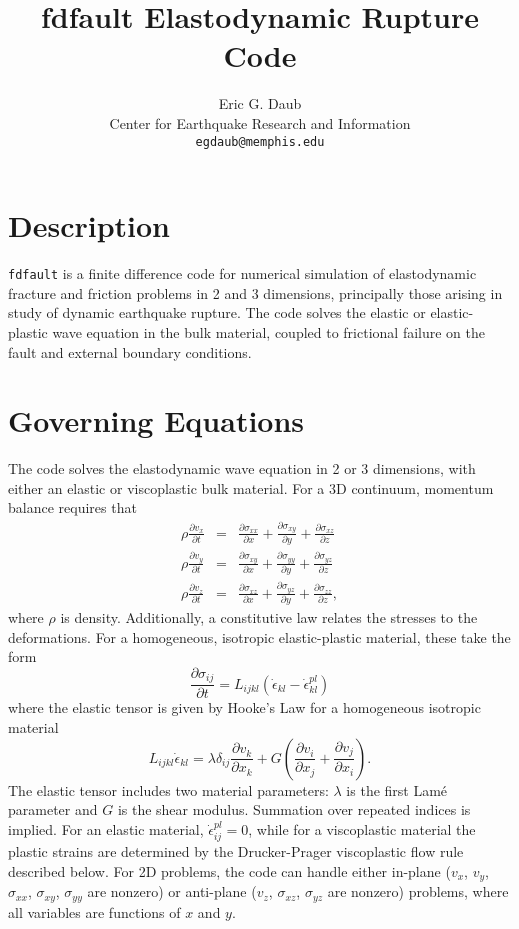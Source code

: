 \documentclass[12pt]{article}   	%
\title{fdfault Elastodynamic Rupture Code}
\author{Eric G. Daub \\
Center for Earthquake Research and Information \\
 {\tt egdaub@memphis.edu}}
\date{}
\begin{document}
\maketitle

\tableofcontents

\section{Description}

{\tt fdfault} is a finite difference code for numerical simulation of elastodynamic fracture and friction problems in 2 and 3 dimensions, principally those arising in study of dynamic earthquake rupture. The code solves the elastic or elastic-plastic wave equation in the bulk material, coupled to frictional failure on the fault and external boundary conditions.

\section{Governing Equations}

The code solves the elastodynamic wave equation in 2 or 3 dimensions, with either an elastic or viscoplastic bulk material. For a 3D continuum, momentum balance requires that
\begin{eqnarray}
\rho\frac{\partial v_x}{\partial t} &=& \frac{\partial \sigma_{xx}}{\partial x}+\frac{\partial \sigma_{xy}}{\partial y}+\frac{\partial \sigma_{xz}}{\partial z} \\
\rho\frac{\partial v_y}{\partial t} &=& \frac{\partial \sigma_{xy}}{\partial x}+\frac{\partial \sigma_{yy}}{\partial y}+\frac{\partial \sigma_{yz}}{\partial z} \\
\rho\frac{\partial v_z}{\partial t} &=& \frac{\partial \sigma_{xz}}{\partial x}+\frac{\partial \sigma_{yz}}{\partial y}+\frac{\partial \sigma_{zz}}{\partial z},
\end{eqnarray}
where $\rho$ is density. Additionally, a constitutive law relates the stresses to the deformations. For a homogeneous, isotropic elastic-plastic material, these take the form
\begin{equation}
\frac{\partial \sigma_{ij}}{\partial t} = L_{ijkl}\left(\dot{\epsilon}_{kl}-\dot{\epsilon}^{pl}_{kl}\right)
\end{equation}
where the elastic tensor is given by Hooke's Law for a homogeneous isotropic material
\begin{equation}
L_{ijkl}\dot{\epsilon}_{kl}=\lambda\delta_{ij}\frac{\partial v_k}{\partial x_k}+G\left(\frac{\partial v_i}{\partial x_j}+\frac{\partial v_j}{\partial x_i}\right).
\end{equation}
The elastic tensor includes two material parameters: $\lambda$ is the first Lam\'{e} parameter and $G$ is the shear modulus. Summation over repeated indices is implied. For an elastic material, $\dot{\epsilon}^{pl}_{ij}=0$, while for a viscoplastic material the plastic strains are determined by the Drucker-Prager viscoplastic flow rule described below. For 2D problems, the code can handle either in-plane ($v_x$, $v_y$, $\sigma_{xx}$, $\sigma_{xy}$, $\sigma_{yy}$ are nonzero) or anti-plane ($v_z$, $\sigma_{xz}$, $\sigma_{yz}$ are nonzero) problems, where all variables are functions of $x$ and $y$.
\end{document}
